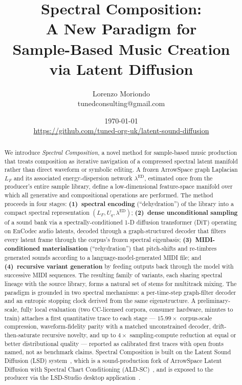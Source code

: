 \documentclass[12pt,a4paper]{article}
\title{\textbf{Spectral Composition: \\
A New Paradigm for\\
Sample-Based Music Creation\\
via Latent Diffusion}}
\author{Lorenzo Moriondo\\
\small{tunedconsulting@gmail.com}}
\affil{
\large{tuned.org.uk}}
\date{\today\\[6pt]
\small\url{https://github.com/tuned-org-uk/latent-sound-diffusion}}
\begin{document}
\maketitle

\begin{abstract}
We introduce \emph{Spectral Composition}, a novel method for sample-based
music production that treats composition as iterative navigation of a
compressed spectral latent manifold rather than direct waveform or
symbolic editing. A frozen ArrowSpace graph Laplacian $L_F$ and its
associated energy-dispersion network $\lambda^{\mathrm{ED}}$, estimated
once from the producer's entire sample library, define a low-dimensional
feature-space manifold over which all generative and compositional
operations are performed. The method proceeds in four stages:
\textbf{(1)~spectral encoding} (``dehydration'') of the library into a
compact spectral representation $(L_F, U_q, \lambda^{\mathrm{ED}})$;
\textbf{(2)~dense unconditional sampling} of a sound bank via a
spectrally-conditioned 1-D diffusion transformer (DiT) operating on
EnCodec audio latents, decoded through a graph-structured decoder that
filters every latent frame through the corpus's frozen spectral
eigenbasis; \textbf{(3)~MIDI-conditioned materialisation}
(``rehydration'') that pitch-shifts and re-timbres generated sounds
according to a language-model-generated MIDI file; and \textbf{(4)~recursive
variant generation} by feeding outputs back through the model with
successive MIDI sequences. The resulting family of variants, each sharing
spectral lineage with the source library, forms a natural set of stems
for multitrack mixing. The paradigm is grounded in two spectral
mechanisms: a per-time-step graph-filter decoder and an entropic
stopping clock derived from the same eigenstructure. A preliminary-scale,
fully local evaluation (two CC-licensed corpora, consumer hardware,
minutes to train) attaches a first quantitative trace to each stage ---
$15.99\times$ corpus-scale compression, waveform-fidelity parity with a
matched unconstrained decoder, drift-then-saturate recursive novelty,
and up to $4\times$ sampling-compute reduction at equal or better
distributional quality --- reported as calibrated first traces with open
fronts named, not as benchmark claims. Spectral Composition is built on
the
Latent Sound Diffusion (LSD) system~\cite{lsd}, which is a
sound-production fork of ArrowSpace Latent Diffusion with Spectral Chart
Conditioning (ALD-SC)~\cite{aldsc}, and is exposed to the producer via
the LSD-Studio desktop application~\cite{lsdstudio}.
\end{abstract}
\end{document}
